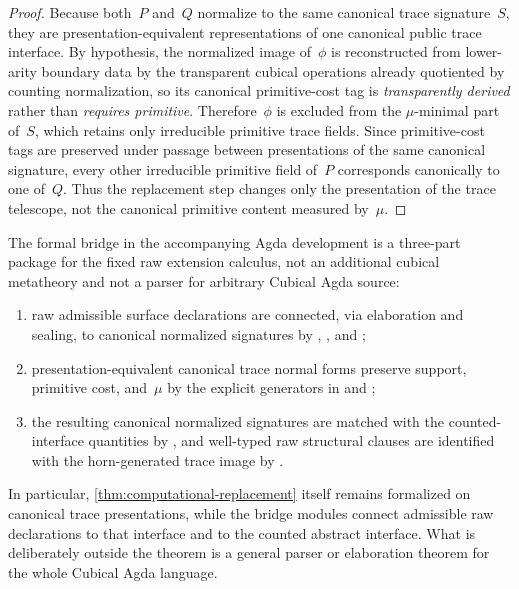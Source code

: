 \documentclass{lmcs}
\begin{document}
\begin{proof}
Because both~$P$ and~$Q$ normalize to the same canonical trace signature~$S$, they are presentation-equivalent representations of one canonical public trace interface. By hypothesis, the normalized image of~$\phi$ is reconstructed from lower-arity boundary data by the transparent cubical operations already quotiented by counting normalization, so its canonical primitive-cost tag is \emph{transparently derived} rather than \emph{requires primitive}. Therefore~$\phi$ is excluded from the $\mu$-minimal part of~$S$, which retains only irreducible primitive trace fields. Since primitive-cost tags are preserved under passage between presentations of the same canonical signature, every other irreducible primitive field of~$P$ corresponds canonically to one of~$Q$. Thus the replacement step changes only the presentation of the trace telescope, not the canonical primitive content measured by~$\mu$.
\end{proof}

\begin{rem}
\label{rem:bridge-target}
The formal bridge in the accompanying Agda development is a three-part package for the fixed raw extension calculus, not an additional cubical metatheory and not a parser for arbitrary Cubical Agda source:
\begin{enumerate}
  \item raw admissible surface declarations are connected, via elaboration and sealing, to canonical normalized signatures by , , and ;
  \item presentation-equivalent canonical trace normal forms preserve support, primitive cost, and~$\mu$ by the explicit  generators in  and ;
  \item the resulting canonical normalized signatures are matched with the counted-interface quantities by , and well-typed raw structural clauses are identified with the horn-generated trace image by .
\end{enumerate}
In particular, \autoref{thm:computational-replacement} itself remains formalized on canonical trace presentations, while the bridge modules connect admissible raw declarations to that interface and to the counted abstract interface. What is deliberately outside the theorem is a general parser or elaboration theorem for the whole Cubical Agda language.
\end{rem}
\end{document}
